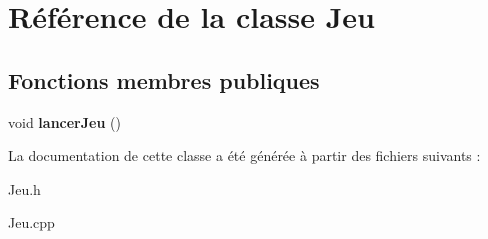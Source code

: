 \hypertarget{classJeu}{\section{\-Référence de la classe \-Jeu}
\label{classJeu}
}
\subsection*{\-Fonctions membres publiques}
\begin{DoxyCompactItemize}
\item 
\hypertarget{classJeu_a84033a99b3f0067d65cb3b4760e03ba6}{void {\bfseries lancer\-Jeu} ()}\label{classJeu_a84033a99b3f0067d65cb3b4760e03ba6}

\end{DoxyCompactItemize}


\-La documentation de cette classe a été générée à partir des fichiers suivants \-:\begin{DoxyCompactItemize}
\item 
\-Jeu.\-h\item 
\-Jeu.\-cpp\end{DoxyCompactItemize}
